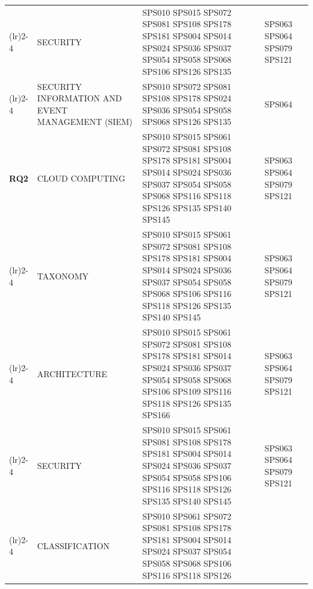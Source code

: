 \begin{table}[htbp]
\begin{tabularx}{\textwidth}{p{0.8cm}p{2.5cm}>{\raggedright\arraybackslash}X>{\raggedright\arraybackslash}X}
		\addlinespace[0.3em]
		\cmidrule(lr){2-4}
		                                     & SECURITY          	   & SPS010 SPS015 SPS072 SPS081 SPS108 SPS178 
																		 SPS181 SPS004 SPS014 SPS024 SPS036 SPS037 
																		 SPS054 SPS058 SPS068 SPS106 SPS126 SPS135    & SPS063 SPS064 SPS079 SPS121         							 \\
		\addlinespace[0.3em]
		\cmidrule(lr){2-4}
		                                     & SECURITY INFORMATION 
											 AND EVENT MANAGEMENT 
											 (SIEM)              	   & SPS010 SPS072 SPS081 SPS108 SPS178 SPS024 
																		 SPS036 SPS054 SPS058 SPS068 SPS126 SPS135    & SPS064                             							 \\
		\midrule
		\multirow{0}{*}[1.2em]{\textbf{RQ2}} & CLOUD COMPUTING         & SPS010 SPS015 SPS061 SPS072 SPS081 SPS108 
																		 SPS178 SPS181 SPS004 SPS014 SPS024 SPS036 
																		 SPS037 SPS054 SPS058 SPS068 SPS116 SPS118 
																		 SPS126 SPS135 SPS140 SPS145             		& SPS063 SPS064 SPS079 SPS121                   				\\
		\addlinespace[0.3em]
		\cmidrule(lr){2-4}
		                                     & TAXONOMY           	   & SPS010 SPS015 SPS061 SPS072 SPS081 SPS108 
																		 SPS178 SPS181 SPS004 SPS014 SPS024 SPS036 
																		 SPS037 SPS054 SPS058 SPS068 SPS106 SPS116 
																		 SPS118 SPS126 SPS135 SPS140 SPS145           & SPS063 SPS064 SPS079 SPS121             						\\
		\addlinespace[0.3em]
		\cmidrule(lr){2-4}
		                                     & ARCHITECTURE            & SPS010 SPS015 SPS061 SPS072 SPS081 SPS108 
																		SPS178 SPS181 SPS014 SPS024 SPS036 SPS037 
																		SPS054 SPS058 SPS068 SPS106 SPS109 SPS116 
																		SPS118 SPS126 SPS135 SPS166      			& SPS063 SPS064 SPS079 SPS121      							    \\
		\addlinespace[0.3em]
		\cmidrule(lr){2-4}
											 & SECURITY         	   & SPS010 SPS015 SPS061 SPS081 SPS108 SPS178 
																		 SPS181 SPS004 SPS014 SPS024 SPS036 SPS037 
																		 SPS054 SPS058 SPS106 SPS116 SPS118 SPS126 
																		 SPS135 SPS140 SPS145             			& SPS063 SPS064 SPS079 SPS121             						\\
		\addlinespace[0.3em]
		\cmidrule(lr){2-4}
											 & CLASSIFICATION          & SPS010 SPS061 SPS072 SPS081 SPS108 SPS178 
																		 SPS181 SPS004 SPS014 SPS024 SPS037 SPS054 
																		 SPS058 SPS068 SPS106 SPS116 SPS118 SPS126 

\end{tabularx}
\end{table}
